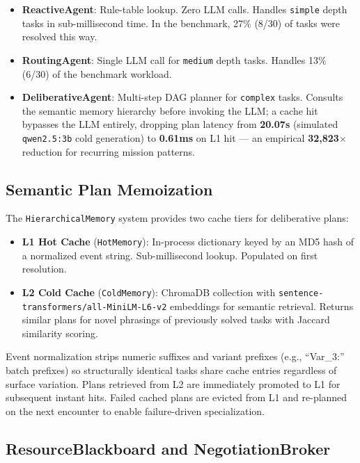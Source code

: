 \documentclass[conference]{IEEEtran}
\begin{document}
\begin{itemize}
\item \textbf{ReactiveAgent}: Rule-table lookup. Zero LLM calls. Handles \texttt{simple}
      depth tasks in sub-millisecond time. In the benchmark, 27\% (8/30) of tasks were
      resolved this way.
\item \textbf{RoutingAgent}: Single LLM call for \texttt{medium} depth tasks. Handles
      13\% (6/30) of the benchmark workload.
\item \textbf{DeliberativeAgent}: Multi-step DAG planner for \texttt{complex} tasks.
      Consults the semantic memory hierarchy before invoking the LLM; a cache hit bypasses
      the LLM entirely, dropping plan latency from \textbf{20.07s} (simulated \texttt{qwen2.5:3b}
      cold generation) to \textbf{0.61ms} on L1 hit --- an empirical \textbf{32,823$\times$} reduction for recurring
      mission patterns.
\end{itemize}

\subsection{Semantic Plan Memoization}

The \texttt{HierarchicalMemory} system provides two cache tiers for deliberative plans:

\begin{itemize}
\item \textbf{L1 Hot Cache} (\texttt{HotMemory}): In-process dictionary keyed by an
      MD5 hash of a normalized event string. Sub-millisecond lookup. Populated on first
      resolution.
\item \textbf{L2 Cold Cache} (\texttt{ColdMemory}): ChromaDB collection with
      \texttt{sentence-transformers/all-MiniLM-L6-v2} embeddings for semantic retrieval.
      Returns similar plans for novel phrasings of previously solved tasks with Jaccard
      similarity scoring.
\end{itemize}

Event normalization strips numeric suffixes and variant prefixes (e.g., ``Var\_3:''
batch prefixes) so structurally identical tasks share cache entries regardless of
surface variation. Plans retrieved from L2 are immediately promoted to L1 for subsequent
instant hits. Failed cached plans are evicted from L1 and re-planned on the next encounter
to enable failure-driven specialization.

\subsection{ResourceBlackboard and NegotiationBroker}
\end{document}
